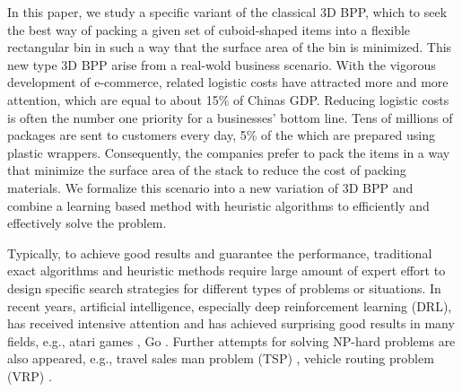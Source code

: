 In this paper, we study a specific variant of the classical 3D BPP, which to seek the best way of packing a given set of cuboid-shaped items into a flexible rectangular bin in such a way that the surface area of the bin is minimized. This new type 3D BPP arise from a real-wold business scenario. With the vigorous development of e-commerce, related logistic costs have attracted more and more attention, which are equal to about 15\% of Chinas GDP. Reducing logistic costs is often the number one priority for a businesses’ bottom line. %
Tens of millions of packages are sent to customers every day, 5\% of the which are prepared using plastic wrappers. Consequently, the companies prefer to pack the items in a way that minimize the surface area of the stack to reduce the cost of packing materials. We formalize this scenario into a new variation of 3D BPP and combine a learning based method with heuristic algorithms to efficiently and effectively solve the problem. 



Typically, to achieve good results and guarantee the performance, traditional exact algorithms and heuristic methods require large amount of expert effort to design specific search strategies for different types of problems or situations. In recent years, artificial intelligence, especially deep reinforcement learning (DRL), has received intensive attention and has achieved surprising good results in many fields, e.g., atari games \cite{mnih2013playing}, Go \cite{silver2016mastering}. Further attempts for solving NP-hard problems are also appeared, e.g., travel sales man problem (TSP) \cite{bello2016neural}, vehicle routing problem (VRP) \cite{nazari2018deep}.


